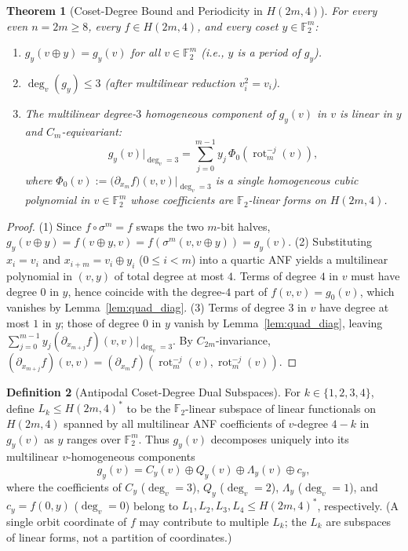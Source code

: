 \documentclass[11pt,a4paper]{article}
\newtheorem{theorem}{Theorem}[section]
\theoremstyle{definition}
\newtheorem{definition}[theorem]{Definition}
\newcommand{\F}{\mathbb{F}_2}
\newcommand{\rot}{\operatorname{rot}}
\begin{document}
\begin{theorem}[Coset-Degree Bound and Periodicity in $H(2m,4)$]
\label{thm:coset_cubic}
For every even $n = 2m \ge 8$, every $f \in H(2m,4)$, and every coset $y \in \F^m$:
\begin{enumerate}
  \item $g_y(v \oplus y) = g_y(v)$ for all $v \in \F^m$ (i.e., $y$ is a period of $g_y$).
  \item $\deg_v(g_y) \le 3$ (after multilinear reduction $v_i^2 = v_i$).
  \item The multilinear degree-$3$ homogeneous component of $g_y(v)$ in $v$ is linear in $y$ and $C_m$-equivariant:
  \[
    g_y(v)\big|_{\deg_v = 3} = \sum_{j=0}^{m-1} y_j \, \Phi_0(\rot_m^{-j}(v)),
  \]
  where $\Phi_0(v) := \big(\partial_{x_m} f\big)(v,v)\big|_{\deg_v=3}$ is a single homogeneous cubic polynomial in $v \in \F^m$ whose coefficients are $\F$-linear forms on $H(2m,4)$.
\end{enumerate}
\end{theorem}
\begin{proof}
(1) Since $f \circ \sigma^m = f$ swaps the two $m$-bit halves, $g_y(v \oplus y) = f(v \oplus y, v) = f(\sigma^m(v, v \oplus y)) = g_y(v)$.
(2) Substituting $x_i = v_i$ and $x_{i+m} = v_i \oplus y_i$ ($0 \le i < m$) into a quartic ANF yields a multilinear polynomial in $(v,y)$ of total degree at most $4$. Terms of degree $4$ in $v$ must have degree $0$ in $y$, hence coincide with the degree-$4$ part of $f(v,v) = g_0(v)$, which vanishes by Lemma~\ref{lem:quad_diag}.
(3) Terms of degree $3$ in $v$ have degree at most $1$ in $y$; those of degree $0$ in $y$ vanish by Lemma~\ref{lem:quad_diag}, leaving $\sum_{j=0}^{m-1} y_j (\partial_{x_{m+j}} f)(v,v)|_{\deg_v=3}$. By $C_{2m}$-invariance, $(\partial_{x_{m+j}} f)(v,v) = (\partial_{x_m} f)(\rot_m^{-j}(v), \rot_m^{-j}(v))$.
\end{proof}

\begin{definition}[Antipodal Coset-Degree Dual Subspaces]
\label{def:layers}
For $k \in \{1, 2, 3, 4\}$, define $L_k \le H(2m,4)^*$ to be the $\F$-linear subspace of linear functionals on $H(2m,4)$ spanned by all multilinear ANF coefficients of $v$-degree $4 - k$ in $g_y(v)$ as $y$ ranges over $\F^m$. Thus $g_y(v)$ decomposes uniquely into its multilinear $v$-homogeneous components
\begin{equation}
\label{eq:layers}
  g_y(v) = C_y(v) \oplus Q_y(v) \oplus \Lambda_y(v) \oplus c_y,
\end{equation}
where the coefficients of $C_y$ ($\deg_v = 3$), $Q_y$ ($\deg_v = 2$), $\Lambda_y$ ($\deg_v = 1$), and $c_y = f(0,y)$ ($\deg_v = 0$) belong to $L_1, L_2, L_3, L_4 \le H(2m,4)^*$, respectively. (A single orbit coordinate of $f$ may contribute to multiple $L_k$; the $L_k$ are subspaces of linear forms, not a partition of coordinates.)
\end{definition}
\end{document}
